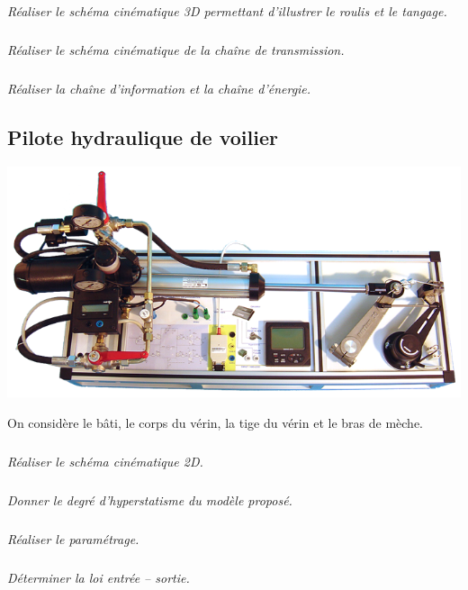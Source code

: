 \documentclass[10pt,fleqn]{article} %
\begin{document}
\begin{multicols}{2}
\subparagraph{}
\textit{Réaliser le schéma cinématique 3D permettant d'illustrer le roulis et le tangage.}


\subparagraph{}
\textit{Réaliser le schéma cinématique de la chaîne de transmission.}


\subparagraph{}
\textit{Réaliser la chaîne d'information et la chaîne d'énergie.}


\subsection*{Pilote hydraulique de voilier}
\setcounter{exo}{0}
\begin{center}
\includegraphics[width=\linewidth]{images/pilote}
\end{center}
On considère le bâti, le corps du vérin, la tige du vérin et le bras de mèche. 

\subparagraph{}
\textit{Réaliser le schéma cinématique 2D.}

\subparagraph{}
\textit{Donner le degré d’hyperstatisme du modèle proposé.}


\subparagraph{}
\textit{Réaliser le paramétrage.}


\subparagraph{}
\textit{Déterminer la loi entrée -- sortie.}

\end{multicols}
\end{document}
